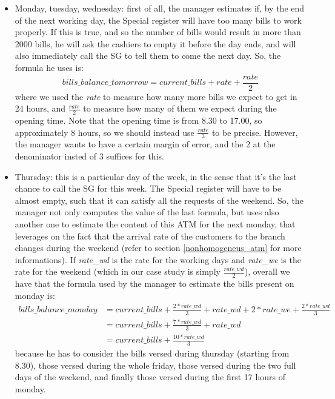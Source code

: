 \documentclass{article}
\begin{document}
\begin{itemize}
    \item Monday, tuesday, wednesday: first of all, the manager estimates if, by the end of the next working day, the Special register will have too many bills to work properly. If this is true, and so the number of bills would result in more than 2000 bills, he will ask the cashiers to empty it before the day ends, and will also immediately call the SG to tell them to come the next day. So, the formula he uses is:
    \begin{equation*}
        bills\_balance\_tomorrow = current\_bills +
        rate + \frac{rate}{2}
    \end{equation*}
    where we used the \emph{rate} to measure how many more bills we expect to get in 24 hours, and $\frac{rate}{2}$ to measure how many of them we expect during the opening time. Note that the opening time is from 8.30 to 17.00, so approximately 8 hours, so we should instead use $\frac{rate}{3}$ to be precise. However, the manager wants to have a certain margin of error, and the 2 at the denominator insted of 3 suffices for this.
    \item Thursday: this is a particular day of the week, in the sense that it's the last chance to call the SG for this week. The Special register will have to be almost empty, such that it can satisfy all the requests of the weekend. So, the manager not only computes the value of the last formula, but uses also another one to estimate the content of this ATM for the next monday, that leverages on the fact that the arrival rate of the customers to the branch changes during the weekend (refer to section \ref{nonhomogeneus_atm} for more informations). If \emph{rate\_wd} is the rate for the working days and \emph{rate\_we} is the rate for the weekend (which in our case study is simply $\frac{rate\_wd}{2}$), overall we have that the formula used by the manager to estimate the bills present on monday is:
    \begin{equation*}
        \begin{aligned}
        bills\_balance\_monday 
        & = current\_bills + \frac{2 * rate\_wd}{3} + rate\_wd + 2 * rate\_we + \frac{2* rate\_wd}{3}\\
        & = current\_bills + \frac{7*rate\_wd}{3} + rate\_wd\\
        & = current\_bills + \frac{10*rate\_wd}{3}
        \end{aligned}
    \end{equation*}
    because he has to consider the bills versed during thursday (starting from 8.30), those versed during the whole friday, those versed during the two full days of the weekend, and finally those versed during the first 17 hours of monday. 

\end{itemize}
\end{document}
